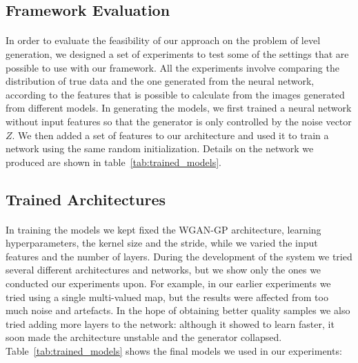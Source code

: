 \subsection{Framework Evaluation}
\label{sec:modelevaluation}
\paragraph{} In order to evaluate the feasibility of our approach on the problem of level generation, we designed a set of experiments to test some of the settings that are possible to use with our framework. 
All the experiments involve comparing the distribution of true data and the one generated from the neural network, according to the features that is possible to calculate from the images generated from different models. In generating the models, we first trained a neural network without input features so that the generator is only controlled by the noise vector $Z$. We then added a set of features to our architecture and used it to train a network using the same random initialization. Details on the network we produced are shown in table~\ref{tab:trained_models}.

\newpage
\subsection{Trained Architectures}
\label{sec:trainednets}
\paragraph{} In training the models we kept fixed the WGAN-GP architecture, learning hyperparameters, the kernel size and the stride, while we varied the input features and the number of layers. During the development of the system we tried several different architectures and networks, but we show only the ones we conducted our experiments upon. For example, in our earlier experiments we tried using a single multi-valued map, but the results were affected from too much noise and artefacts. In the hope of obtaining better quality samples we also tried adding more layers to the network: although it showed to learn faster, it soon made the architecture unstable and the generator collapsed. Table~\ref{tab:trained_models} shows the final models we used in our experiments:

